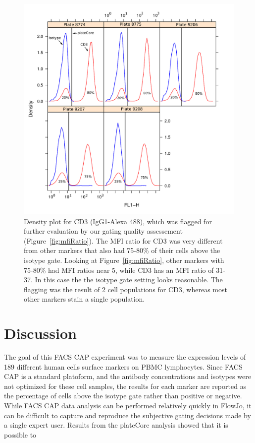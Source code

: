 \documentclass[12pt]{article}
\begin{document}
\begin{figure}
\centering
\includegraphics{mfiRatio2.pdf}
\caption{Density plot for CD3 (IgG1-Alexa 488), which was flagged for further
evaluation by our gating quality assessement (Figure~\ref{fig:mfiRatio}).
The MFI ratio for CD3 was very different from other markers that also had
75-80\% of their cells above the isotype gate. Looking at
Figure~\ref{fig:mfiRatio}, other markers with 75-80\% had MFI ratios near 5,
while CD3 has an MFI ratio of 31-37. In this case the the isotype
gate setting looks reasonable. The flagging was the result of 2 cell
populations for CD3, whereas most other markers stain a single population.
}
\label{fig:mfiRatio3}
\end{figure}

\clearpage
\section*{Discussion}

The goal of this FACS CAP experiment was to measure the expression levels of 189
different human cells surface markers on PBMC lymphocytes. Since FACS CAP is a
standard platoform, and the antibody concentrations and isotypes were not
optimized for these cell samples, the results for each marker are reported as
the percentage of cells above the isotype gate rather than positive or
negative. While FACS CAP data analysis can be performed relatively quickly in
FlowJo, it can be difficult to capture and reproduce the subjective gating
decisions made by a single expert user. Results from the plateCore analysis
showed that it is possible to 
\end{document}
